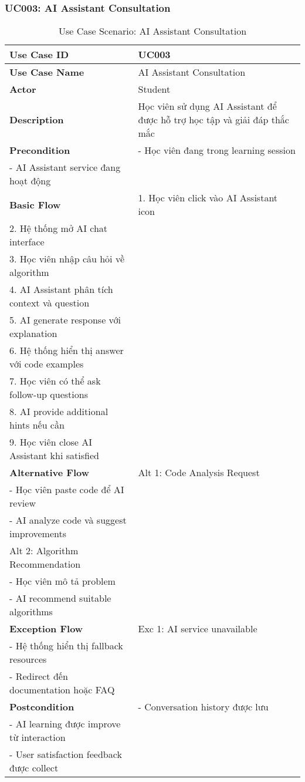 \subsubsection{UC003: AI Assistant Consultation}

\begin{table}[H]
\centering
\begin{tabular}{|p{3cm}|p{10cm}|}
\hline
\textbf{Use Case ID} & UC003 \\
\hline
\textbf{Use Case Name} & AI Assistant Consultation \\
\hline
\textbf{Actor} & Student \\
\hline
\textbf{Description} & Học viên sử dụng AI Assistant để được hỗ trợ học tập và giải đáp thắc mắc \\
\hline
\textbf{Precondition} & 
- Học viên đang trong learning session \\
- AI Assistant service đang hoạt động \\
\hline
\textbf{Basic Flow} & 
1. Học viên click vào AI Assistant icon \\
2. Hệ thống mở AI chat interface \\
3. Học viên nhập câu hỏi về algorithm \\
4. AI Assistant phân tích context và question \\
5. AI generate response với explanation \\
6. Hệ thống hiển thị answer với code examples \\
7. Học viên có thể ask follow-up questions \\
8. AI provide additional hints nếu cần \\
9. Học viên close AI Assistant khi satisfied \\
\hline
\textbf{Alternative Flow} & 
Alt 1: Code Analysis Request \\
- Học viên paste code để AI review \\
- AI analyze code và suggest improvements \\
Alt 2: Algorithm Recommendation \\
- Học viên mô tả problem \\
- AI recommend suitable algorithms \\
\hline
\textbf{Exception Flow} & 
Exc 1: AI service unavailable \\
- Hệ thống hiển thị fallback resources \\
- Redirect đến documentation hoặc FAQ \\
\hline
\textbf{Postcondition} & 
- Conversation history được lưu \\
- AI learning được improve từ interaction \\
- User satisfaction feedback được collect \\
\hline
\end{tabular}
\caption{Use Case Scenario: AI Assistant Consultation}
\label{tab:uc003}
\end{table}

